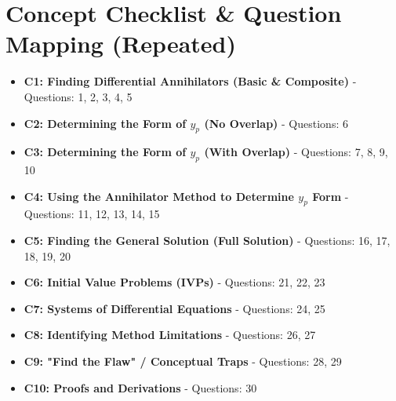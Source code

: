 \documentclass[11pt]{article}
\begin{document}
\section{Concept Checklist \& Question Mapping (Repeated)}
\label{sec:checklist_end}
\begin{itemize}
    \item \textbf{C1: Finding Differential Annihilators (Basic \& Composite)} - Questions: 1, 2, 3, 4, 5
    \item \textbf{C2: Determining the Form of $y_p$ (No Overlap)} - Questions: 6
    \item \textbf{C3: Determining the Form of $y_p$ (With Overlap)} - Questions: 7, 8, 9, 10
    \item \textbf{C4: Using the Annihilator Method to Determine $y_p$ Form} - Questions: 11, 12, 13, 14, 15
    \item \textbf{C5: Finding the General Solution (Full Solution)} - Questions: 16, 17, 18, 19, 20
    \item \textbf{C6: Initial Value Problems (IVPs)} - Questions: 21, 22, 23
    \item \textbf{C7: Systems of Differential Equations} - Questions: 24, 25
    \item \textbf{C8: Identifying Method Limitations} - Questions: 26, 27
    \item \textbf{C9: "Find the Flaw" / Conceptual Traps} - Questions: 28, 29
    \item \textbf{C10: Proofs and Derivations} - Questions: 30
\end{itemize}
\end{document}

